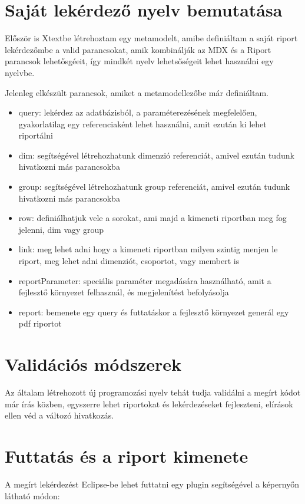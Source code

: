 \section{Saját lekérdező nyelv bemutatása}

Először is Xtextbe létrehoztam egy metamodelt, amibe definiáltam a saját riport lekérdezőmbe a valid parancsokat, amik kombinálják az MDX és a Riport parancsok lehetősgéeit, így mindkét nyelv lehetsőségeit lehet használni egy nyelvbe.

Jelenleg elkészült parancsok, amiket a metamodellezőbe már definiáltam.
\begin{itemize}
  \item query: lekérdez az adatbázisból, a paraméterezésének megfelelően,
  gyakorlatilag egy referenciaként lehet használni, amit ezután ki lehet
  riportálni
  \item dim: segítségével létrehozhatunk dimenzió referenciát, amivel ezután
  tudunk hivatkozni más parancsokba
  \item group: segítségével létrehozhatunk group referenciát, amivel ezután
  tudunk hivatkozni más parancsokba
  \item row: definiálhatjuk vele a sorokat, ami majd a kimeneti riportban meg
  fog jelenni, dim vagy group
  \item link: meg lehet adni hogy a kimeneti riportban milyen szintig menjen le
  riport, meg lehet adni dimenziót, csoportot, vagy membert is
  \item reportParameter: speciális paraméter megadására használható, amit a
  fejlesztő környezet felhasznál, és megjelenítést befolyásolja
  \item report: bemenete egy query és futtatáskor a fejlesztő környezet generál
  egy pdf riportot 
\end{itemize}


\section{Validációs módszerek}
Az általam létrehozott új programozási nyelv tehát tudja validálni a megírt kódot már írás közben, egyszerre lehet riportokat és lekérdezéseket fejleszteni, elírások ellen véd a változó hivatkozás.

\section{Futtatás és a riport kimenete}
A megírt lekérdezést Eclipse-be lehet futtatni egy plugin segítségével a képernyőn látható módon:

